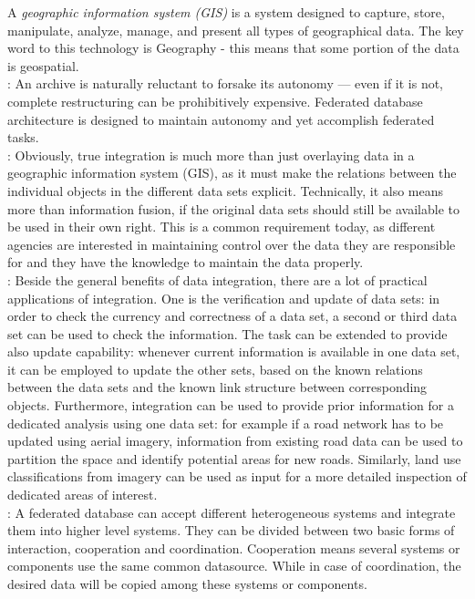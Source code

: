 \documentclass[12pt,a4paper]{report}
\newcommand{\term}{\textit}
\newcommand{\acr}{\MakeUppercase}
\begin{document}
	A \term{geographic information system (\acr{gis})} is a system designed to capture, store, manipulate, analyze, manage, and present all types of geographical data. The key word to this technology is Geography - this means that some portion of the data is geospatial.
	\\



	\citep{Malik}: An archive is naturally reluctant to forsake its autonomy --- even if it is not, complete restructuring can be prohibitively expensive. Federated database architecture is designed to maintain autonomy and yet accomplish federated tasks.
	\\

	\citep{Butenuth}: Obviously, true integration is much more than just overlaying data in a geographic information system (GIS), as it must make the relations between the individual objects in the different data sets explicit. Technically, it also means more than information fusion, if the original data sets should still be available to be used in their own right. This is a common requirement today, as different agencies are interested in maintaining control over the data they are responsible for and they have the knowledge to maintain the data properly.
	\\

	\citep{Butenuth}: Beside the general benefits of data integration, there are a lot of practical applications of integration. One is the verification and update of data sets: in order to check the currency and correctness of a data set, a second or third data set can be used to check the information. The task can be extended to provide also update capability: whenever current information is available in one data set, it can be employed to update the other sets, based on the known relations between the data sets and the known link structure between corresponding objects. Furthermore, integration can be used to provide prior information for a dedicated analysis using one data set: for example if a road network has to be updated using aerial imagery, information from existing road data can be used to partition the space and identify potential areas for new roads. Similarly, land use classifications from imagery can be used as input for a more detailed inspection of dedicated areas of interest. 
	\\

	\citep{Jian}: A federated database can accept different heterogeneous systems and integrate them into higher level systems. They can be divided between two basic forms of interaction, cooperation and coordination. Cooperation means several systems or components use the same common datasource. While in case of coordination, the desired data will be copied among these systems or components.
	\\
\end{document}
